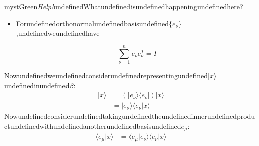 \begin{mystadmonition}{mystGreen}{\emph{Help!}undefinedWhatundefinedisundefinedhappeningundefinedhere?}
\begin{itemize}
\item Forundefinedorthonormalundefinedbasisundefined$\{e_{\nu}\}$,undefinedweundefinedhave

\begin{equation}
\sum_{\nu=1}^n e_{\nu}e_{\nu}^T=I
\end{equation}
\end{itemize}

\end{mystadmonition}
Nowundefinedweundefinedconsiderundefinedrepresentingundefined$|x\rangle$undefinedinundefined$\beta$:
\begin{equation}
\begin{aligned}
|x\rangle &= (|e_{\nu} \rangle \langle e_{\nu}|) |x\rangle \\
&= |e_{\nu}\rangle \langle e_{\nu}|x\rangle
\end{aligned}
\end{equation}
Nowundefinedconsiderundefinedtakingundefinedtheundefinedinnerundefinedproductundefinedwithundefinedanotherundefinedbasisundefined$e_{\mu}$:
\begin{equation}
\begin{aligned}
\langle e_{\mu}|x\rangle  &=\langle e_{\mu}|e_{\nu}\rangle \langle e_{\nu}|x\rangle
\end{aligned}
\end{equation}